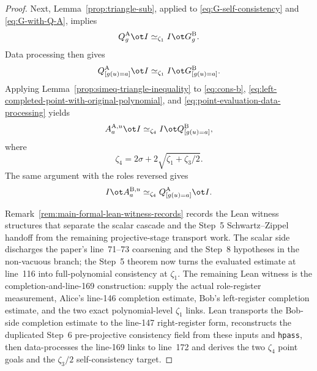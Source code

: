 \begin{proof}
	Next, Lemma~\ref{prop:triangle-sub}, applied to \ref{eq:G-self-consistency} and \ref{eq:G-with-Q-A}, implies
	\[
		Q_g^{\mathrm A} \ot I \simeq_{\zeta_1} I \ot G_g^{\mathrm B}.
	\]
	Data processing then gives
	\begin{equation}\label{eq:left-completed-point-with-original-polynomial}
		Q_{[g(u)=a]}^{\mathrm A} \ot I \simeq_{\zeta_1} I \ot G_{[g(u)=a]}^{\mathrm B}.
	\end{equation}
	Applying Lemma~\ref{prop:simeq-triangle-inequality} to \ref{eq:cons-b}, \ref{eq:left-completed-point-with-original-polynomial}, and \ref{eq:point-evaluation-data-processing} yields
	\begin{equation}\label{eq:final-left-point-consistency}
		A_a^{\mathrm A,u} \ot I \simeq_{\zeta_4} I \ot Q_{[g(u)=a]}^{\mathrm B},
	\end{equation}
	where
	\[
		\zeta_4 = 2\sigma + 2\sqrt{\zeta_1+\zeta_3/2}.
	\]
	The same argument with the roles reversed gives
	\begin{equation}\label{eq:final-right-point-consistency}
		I \ot A_a^{\mathrm B,u} \simeq_{\zeta_4} Q_{[g(u)=a]}^{\mathrm A} \ot I.
	\end{equation}

	Remark~\ref{rem:main-formal-lean-witness-records} records the Lean witness
	structures that separate the scalar cascade and the Step~5 Schwartz--Zippel
	handoff from the remaining projective-stage transport work.  The scalar side
	discharges the paper's line~71--73 coarsening and the Step~8 hypotheses in the
	non-vacuous branch; the Step~5 theorem now turns the evaluated estimate at
	line~116 into full-polynomial consistency at $\zeta_1$.  The remaining Lean
	witness is the completion-and-line-169 construction: supply the actual
	role-register measurement, Alice's line-146 completion estimate, Bob's
	left-register completion estimate, and the two exact polynomial-level
	$\zeta_1$ links.  Lean transports the Bob-side completion estimate to the
	line-147 right-register form, reconstructs the duplicated Step~6 pre-projective
	consistency field from these inputs and \texttt{hpass}, then data-processes the
	line-169 links to line~172 and derives the two $\zeta_4$ point goals and the
	$\zeta_3/2$ self-consistency target.


\end{proof}
